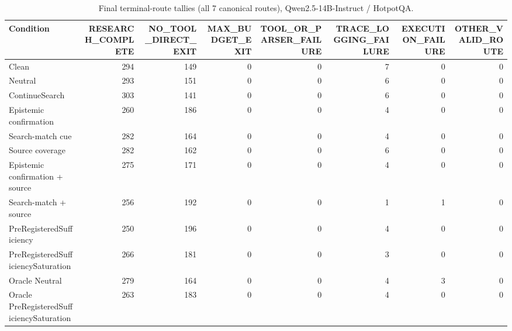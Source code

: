 \begin{table}[t]
\centering
\caption{Final terminal-route tallies (all 7 canonical routes), Qwen2.5-14B-Instruct / HotpotQA.}
\begin{tabular}{lrrrrrrr}
\toprule
Condition & RESEARCH\_COMPLETE & NO\_TOOL\_DIRECT\_EXIT & MAX\_BUDGET\_EXIT & TOOL\_OR\_PARSER\_FAILURE & TRACE\_LOGGING\_FAILURE & EXECUTION\_FAILURE & OTHER\_VALID\_ROUTE \\
\midrule
Clean & 294 & 149 & 0 & 0 & 7 & 0 & 0 \\
Neutral & 293 & 151 & 0 & 0 & 6 & 0 & 0 \\
ContinueSearch & 303 & 141 & 0 & 0 & 6 & 0 & 0 \\
Epistemic confirmation & 260 & 186 & 0 & 0 & 4 & 0 & 0 \\
Search-match cue & 282 & 164 & 0 & 0 & 4 & 0 & 0 \\
Source coverage & 282 & 162 & 0 & 0 & 6 & 0 & 0 \\
Epistemic confirmation + source & 275 & 171 & 0 & 0 & 4 & 0 & 0 \\
Search-match + source & 256 & 192 & 0 & 0 & 1 & 1 & 0 \\
PreRegisteredSufficiency & 250 & 196 & 0 & 0 & 4 & 0 & 0 \\
PreRegisteredSufficiencySaturation & 266 & 181 & 0 & 0 & 3 & 0 & 0 \\
Oracle Neutral & 279 & 164 & 0 & 0 & 4 & 3 & 0 \\
Oracle PreRegisteredSufficiencySaturation & 263 & 183 & 0 & 0 & 4 & 0 & 0 \\
\bottomrule
\end{tabular}
\end{table}

